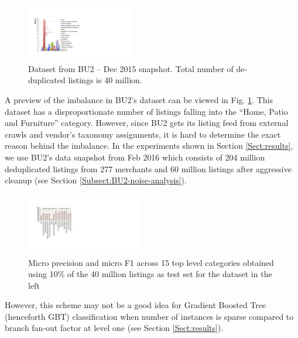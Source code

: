 \begin{figure}
	\centering
	\vspace{-0.6cm}
	\includegraphics[width=0.42\textwidth]{images/BU2-dataset-Dec2015}
	\vspace{-0.6cm}
	\caption{{\small Dataset from BU2 -- Dec 2015 snapshot. Total number of de-duplicated listings is 40 million.}}
	\vspace{-0.6cm}
	\label{Figure_BU2-datset-earlier}
\end{figure}
A preview of the imbalance in BU2's dataset can be viewed in Fig. \ref{Figure_BU2-datset-earlier}.  
This dataset has a disproportionate number of listings falling into the ``Home, Patio and Furniture'' category.
However, since BU2 gets its listing feed from external crawls and vendor's taxonomy assignments, it is hard to determine the exact reason behind the imbalance. 
In the experiments shown in Section \ref{Sect:results}, we use BU2's data snapshot from Feb 2016 which consists of 204 million deduplicated listings from 277 merchants and 60 million listings after aggressive cleanup (see Section \ref{Subsect:BU2-noise-analysis}).


\begin{figure}
	\centering
	\vspace{-0.6cm}
	\includegraphics[width=0.45\textwidth]{images/BU2-Dec2015-LogRegL1}
	\vspace{-0.6cm}
	\caption{{\small Micro precision and micro F1 across 15 top level categories obtained using 10\% of the 40 million listings as test set for the dataset in the left }}
	\label{Figure_BU2-WUC-LogRegL1}
	\vspace{-0.4cm}
\end{figure}
However, this scheme may not be a good idea for Gradient Boosted Tree (henceforth GBT) \cite{Friedman:GBT} classification when number of instances is sparse compared to branch fan-out factor at level one (see Section \ref{Sect:results}).

